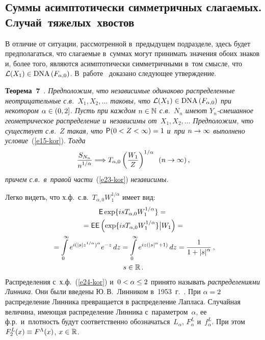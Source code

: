 \begin{multicols}{2}
\subsection{Суммы асимптотически симметричных слагаемых. Случай~тяжелых~хвостов}

В отличие от ситуации, рассмотренной в~предыду\-щем подразделе, здесь
будет предполагаться, что слагаемые в~суммах могут принимать
значения обоих знаков и, более того, являются асимптотически
симметричными в~том смысле, что $\mathcal{L}(X_1)\hm\in
\mathrm{DNA}\,(F_{\alpha,0})$. В~работе~\cite{Korolev2016TVP} доказано
сле\-ду\-ющее утверждение.

\smallskip

\noindent
\textbf{Теорема~7}~\cite{Korolev2016TVP}. \textit{Предположим, что
независимые одинаково распределенные неотрицательные с.в.\
$X_1,X_2,\ldots$ таковы, что $\mathcal{L}(X_1)\hm\in \mathrm{DNA}\,(F_{\alpha,0})$
при некотором $\alpha\hm\in(0,2]$. Пусть при каждом $n\hm\in\mathbb{N}$ с.в.~$N_n$ 
имеют $Y_n$-сме\-шан\-ное геометрическое распределение 
и~независимы от~$X_1,X_2,\ldots$ Предположим, что существует с.в.~$Z$
такая, что ${\sf P}(0\hm<Z\hm<\infty)\hm=1$ и~при $n\hm\to\infty$ выполнено
условие}~(\ref{e15-kor}). \textit{Тогда}
\begin{equation}
\displaystyle\frac{\displaystyle S_{N_n}\mathstrut}{\displaystyle n^{1/\alpha}\mathstrut}\Longrightarrow T_{\alpha,0}
\left(\displaystyle\frac{\displaystyle W_1\mathstrut}{\displaystyle Z\mathstrut}\right)^{1/\alpha}\enskip (n\to\infty)\,,
\label{e23-kor}
\end{equation}
\textit{причем с.в.\ в~правой части}~(\ref{e23-kor}) \textit{независимы.}

\smallskip

Легко видеть, что х.ф.\ с.в.~$T_{\alpha,0}W_1^{1/\alpha}$ имеет вид:
\begin{multline}
{\sf E}\exp\{isT_{\alpha,0}W_1^{1/\alpha}\}={}\\
{}={\sf E}{\sf E}
\left(\exp\{isT_{\alpha,0}W_1^{1/\alpha}\}\big|W_1\right)=
{}\\
{}=\int\limits_{0}^{\infty}e^{i(|s|z^{1/\alpha})^{\alpha}}e^{-z}\,dz=
\int\limits_{0}^{\infty}e^{iz(|s|^{\alpha}+1)}\,dz=\displaystyle\frac{\displaystyle 1\mathstrut}{\displaystyle 1+|s|^{\alpha}\mathstrut}\,,\\
s\in\mathbb{R}\,.\label{e24-kor}
\end{multline}
Распределения с~х.ф.~(\ref{e24-kor}) и~$0\hm<\alpha\hm\le2$ принято называть {\it
распределениями Линника}. Они были введены Ю.\,В.~Линником в~1953~г.~\cite{Linnik1953}. 
При $\alpha\hm=2$ распределение Линника превращается
в распределение Лапласа. Случайная величина, имеющая распределение Линника 
с~параметром~$\alpha$, ее ф.р.\ и~плот\-ность будут соответственно
обозначаться~$L_{\alpha}$, $F_{\alpha}^{L}$ и~$f_{\alpha}^{L}$. При
этом $F_2^{L}(x)\hm\equiv F^{\Lambda}(x)$, $x\hm\in\mathbb{R}$.


\end{multicols}
